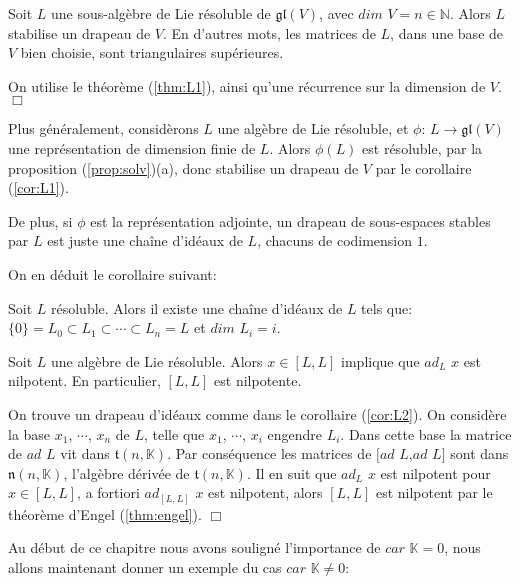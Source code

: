 \documentclass[a4paper,openany,12pt]{report}
\newcommand{\KK}{\mathbb{K}}
\newcommand{\NN}{\mathbb{N}}
\newcommand{\gl}{\mathfrak{gl}}
\newcommand{\ttt}{\mathfrak{t}}
\newcommand{\nn}{\mathfrak{n}}
\theoremstyle{break}
{\theorembodyfont{\upshape}
\newtheorem*{rmq}{Remarque :}
\newtheorem*{prv}{Preuve :}
\newtheorem*{ex}{Exemples :}
\newtheorem*{exe}{Exemple : }
\newtheorem*{nota}{Notation :}
\newtheorem*{dem}{D\'emonstration :}}
\begin{document}
\begin{cor}\label{cor:L1}
\quad Soit $L$ une sous-algèbre de Lie résoluble de $\gl(V)$, avec $dim$ $V = n \in \NN$. Alors $L$ stabilise un drapeau de $V$.
En d'autres mots, les matrices de $L$, dans une base de $V$ bien choisie, sont triangulaires supérieures.
\end{cor}

\begin{prv}
\quad On utilise le théorème (\ref{thm:L1}), ainsi qu'une récurrence sur la dimension de $V$. $\Box$
\end{prv}

Plus généralement, considèrons $L$ une algèbre de Lie résoluble, et $\phi$: $L \to \gl(V)$ une représentation de dimension finie de $L$. Alors $\phi(L)$ est résoluble, par la proposition (\ref{prop:solv})(a), donc stabilise un drapeau de $V$ par le corollaire (\ref{cor:L1}).

De plus, si $\phi$ est la représentation adjointe, un drapeau de sous-espaces stables par $L$ est juste une chaîne d'idéaux de $L$, chacuns de codimension $1$.

On en déduit le corollaire suivant: 

\begin{cor}\label{cor:L2}
\quad Soit $L$ résoluble. Alors il existe une chaîne d'idéaux de $L$ tels que:
\center $\{0\}=L_{0} \subset L_{1} \subset \cdots \subset L_{n} = L$ et $dim$ $L_{i}=i$.
\end{cor}

\begin{cor}\label{cor:L3}
\quad Soit $L$ une algèbre de Lie résoluble. Alors $x \in [L,L]$ implique que $ad_{L}$ $x$ est nilpotent.
En particulier, $[L,L]$ est nilpotente.
\end{cor}

\begin{prv}
\quad On trouve un drapeau d'idéaux comme dans le corollaire (\ref{cor:L2}). On considère la base $x_{1}$, $\cdots$, $x_{n}$ de $L$, telle que $x_{1}$, $\cdots$, $x_{i}$ engendre $L_{i}$. Dans cette base la matrice de $ad$ $L$ vit dans $\ttt(n,\KK)$. Par conséquence les matrices de $[ad$ $L$,$ad$ $L]$ sont dans $\nn(n,\KK)$, l'algèbre dérivée de $\ttt(n,\KK)$. Il en suit que $ad_{L}$ $x$ est nilpotent pour $x \in [L,L]$, a fortiori $ad_{[L,L]}$ $x$ est nilpotent, alors $[L,L]$ est nilpotent par le théorème d'Engel (\ref{thm:engel}). $\Box$
\end{prv}

Au début de ce chapitre nous avons souligné l'importance de $car$ $\KK = 0$, nous allons maintenant donner un exemple du cas $car$ $\KK \neq 0$:
\end{document}
